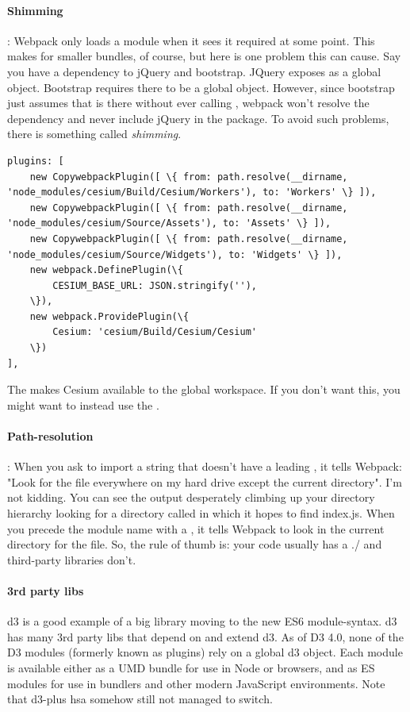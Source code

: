 \paragraph{Shimming}: Webpack only loads a module when it sees it required at some point. This makes for smaller bundles, of course, but here is one problem this can cause. Say you have a dependency to jQuery and bootstrap. JQuery exposes  as a global object. Bootstrap requires there to be a global  object. However, since bootstrap just assumes that  is there without ever calling , webpack won't resolve the dependency and never include jQuery in the package. To avoid such problems, there is something called \emph{shimming}. 

\begin{lstlisting}
plugins: [
    new CopywebpackPlugin([ \{ from: path.resolve(__dirname, 'node_modules/cesium/Build/Cesium/Workers'), to: 'Workers' \} ]),
    new CopywebpackPlugin([ \{ from: path.resolve(__dirname, 'node_modules/cesium/Source/Assets'), to: 'Assets' \} ]),
    new CopywebpackPlugin([ \{ from: path.resolve(__dirname, 'node_modules/cesium/Source/Widgets'), to: 'Widgets' \} ]),
    new webpack.DefinePlugin(\{
        CESIUM_BASE_URL: JSON.stringify(''),
    \}),
    new webpack.ProvidePlugin(\{
        Cesium: 'cesium/Build/Cesium/Cesium'
    \})
],
\end{lstlisting}

The  makes Cesium available to the global workspace. If you don't want this, you might want to instead use the .

\paragraph{Path-resolution}: When you ask to import a string that doesn't have a leading , it tells Webpack: "Look for the file everywhere on my hard drive except the current directory". I'm not kidding. You can see the output desperately climbing up your directory hierarchy looking for a directory called  in which it hopes to find index.js.
When you precede the module name with a , it tells Webpack to look in the current directory for the file. So, the rule of thumb is: your code usually has a ./ and third-party libraries don't.

\paragraph{3rd party libs} d3 is a good example of a big library moving to the new ES6 module-syntax. d3 has many 3rd party libs that depend on and extend d3. As of D3 4.0, none of the D3 modules (formerly known as plugins) rely on a global d3 object. Each module is available either as a UMD bundle for use in Node or browsers, and as ES modules for use in bundlers and other modern JavaScript environments. Note that d3-plus hsa somehow still not managed to switch.

